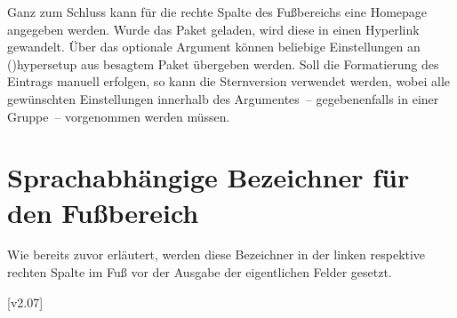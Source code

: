 \begin{DeclareEntity}{}
\begin{Declaration}
  {}
\begin{Declaration}
  {}
\printdeclarationlist

Ganz zum Schluss kann für die rechte Spalte des Fußbereichs eine Homepage 
angegeben werden. Wurde das Paket  geladen, wird diese in 
einen Hyperlink gewandelt. Über das optionale Argument können beliebige 
Einstellungen an \Macro(){hypersetup} aus besagtem 
Paket übergeben werden. Soll die Formatierung des Eintrags manuell erfolgen, so 
kann die Sternversion  verwendet werden, wobei alle gewünschten 
Einstellungen innerhalb des Argumentes~-- gegebenenfalls in einer Gruppe~-- 
vorgenommen werden müssen.
\end{Declaration}
\end{Declaration}
%



\section{Sprachabhängige Bezeichner für den Fußbereich}

\begin{Declaration}
  {}
\begin{Declaration}
  {}
\begin{Declaration}
  {}
\printdeclarationlist[Bezeichner|!]

Wie bereits zuvor erläutert, werden diese Bezeichner in der linken respektive 
rechten Spalte im Fuß vor der Ausgabe der eigentlichen Felder gesetzt.
\end{Declaration}
\end{Declaration}
\end{Declaration}

[v2.07]
\end{DeclareEntity}
